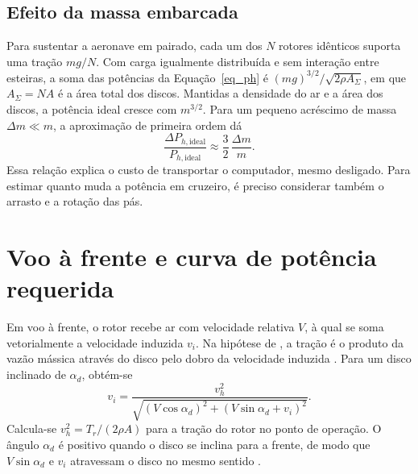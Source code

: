 \subsection{Efeito da massa embarcada}

Para sustentar a aeronave em pairado, cada um dos $N$ rotores idênticos suporta uma tração $mg/N$. Com carga igualmente distribuída e sem interação entre esteiras, a soma das potências da Equação~\eqref{eq_ph} é $(mg)^{3/2}/\sqrt{2\rho A_{\Sigma}}$, em que $A_{\Sigma}=NA$ é a área total dos discos. Mantidas a densidade do ar e a área dos discos, a potência ideal cresce com $m^{3/2}$. Para um pequeno acréscimo de massa $\Delta m\ll m$, a aproximação de primeira ordem dá
\begin{equation}
  \frac{\Delta P_{h,\mathrm{ideal}}}{P_{h,\mathrm{ideal}}} \approx \frac{3}{2}\,\frac{\Delta m}{m}.
  \label{eq_dm}
\end{equation}
Essa relação explica o custo de transportar o computador, mesmo desligado. Para estimar quanto muda a potência em cruzeiro, é preciso considerar também o arrasto e a rotação das pás.

\section{Voo à frente e curva de potência requerida}
\label{sec_voo_frente}

Em voo à frente, o rotor recebe ar com velocidade relativa $V$, à qual se soma vetorialmente a velocidade induzida $v_i$. Na hipótese de , a tração é o produto da vazão mássica através do disco pelo dobro da velocidade induzida \cite[p.~93--96]{leishman2006}. Para um disco inclinado de $\alpha_d$, obtém-se
\begin{equation}
  v_i = \frac{v_h^{2}}{\sqrt{(V\cos\alpha_d)^{2} + (V\sin\alpha_d + v_i)^{2}}}.
  \label{eq_glauert}
\end{equation}
Calcula-se $v_h^2=T_r/(2\rho A)$ para a tração do rotor no ponto de operação. O ângulo $\alpha_d$ é positivo quando o disco se inclina para a frente, de modo que $V\sin\alpha_d$ e $v_i$ atravessam o disco no mesmo sentido \cite[p.~93]{leishman2006}.

